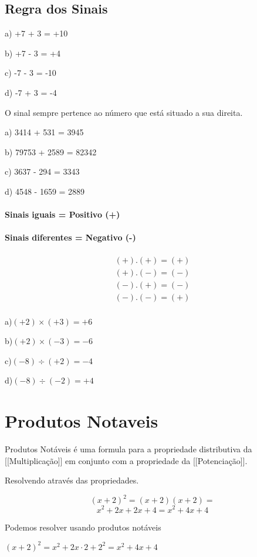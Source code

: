\documentclass[letterpaper]{book}
\begin{document}
\subsection{Regra dos Sinais}

a) +7 + 3 = +10

b) +7 - 3 = +4

c) -7 - 3 = -10

d) -7 + 3 = -4


O sinal sempre pertence ao número que está situado a sua direita.

a) 3414 + 531 = 3945

b) 79753 + 2589 = 82342

c) 3637 - 294 = 3343

d) 4548 - 1659 = 2889

\paragraph{Sinais iguais = Positivo (+)}
\paragraph{Sinais diferentes = Negativo (-)}


\begin{align}
(+).(+) = (+)\\
(+).(-) = (-)\\
(-).(+) = (-)\\
(-).(-) = (+)\\
\end{align}

a)\((+2)\times(+3)=+6\)

b)\((+2)\times(-3)=-6\)

c)\((-8)\div(+2)=-4\)

d)\((-8)\div(-2)=+4\)

\section{Produtos Notaveis}

Produtos Notáveis é uma formula para a propriedade distributiva da [[Multiplicação]] em conjunto com a propriedade da [[Potenciação]].

Resolvendo através das propriedades.

\[(x+2)^{2} = (x+2)(x+2) =\] \[x^{2}+2x+2x+4=x^{2}+4x+4\]

Podemos resolver usando produtos notáveis

$(x + 2)^{2}=x^{2}+2x \cdot 2 + 2^{2} = x^{2} + 4x + 4$
\end{document}
